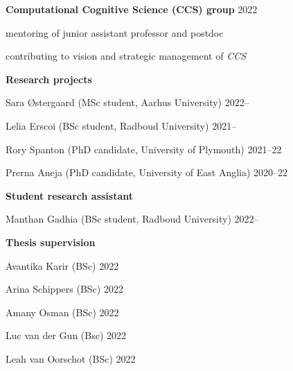 \documentclass[10pt]{article}
\newenvironment{outerlist}[1][\enskip\textbullet]%
        {\begin{itemize}[#1]}{\end{itemize}%
         \vspace{-.6\baselineskip}}
\newenvironment{innerlist}[1][\enskip\textbullet]%
        {\begin{compactitem}[#1]}{\end{compactitem}}
\begin{document}
\begin{outerlist}
 
    
     \item[\textbf{Computational Cognitive Science (CCS) group}] \hfill 2022

      \begin{innerlist}
       \item mentoring of junior assistant professor and postdoc
       \item contributing to vision and strategic management of \textit{CCS} 
    \end{innerlist}  
    
    

    \item[\textbf{Research projects}] \hfill
      \begin{innerlist}
        \item Sara Østergaard (MSc student, Aarhus University) \hfill 2022--
        \item Lelia Erscoi (BSc student, Radboud University) \hfill 2021--
        \item Rory Spanton (PhD candidate, University of Plymouth) \hfill 2021--22
        \item Prerna Aneja (PhD candidate, University of East Anglia) \hfill 2020--22
    \end{innerlist}  

    \item[\textbf{Student research assistant}] \hfill
      \begin{innerlist}
        \item Manthan Gadhia (BSc student, Radboud University) \hfill 2022--
    \end{innerlist}  
  
      \item[\textbf{Thesis supervision}] \hfill
      \begin{innerlist}
        \item Avantika Karir (BSc) \hfill 2022
        \item Arina Schippers (BSc) \hfill 2022
        \item Amany Osman (BSc) \hfill 2022
        \item Luc van der Gun (Bsc) \hfill 2022
        \item Leah van Oorschot (BSc) \hfill 2022
        

\end{innerlist}
\end{outerlist}
\end{document}
